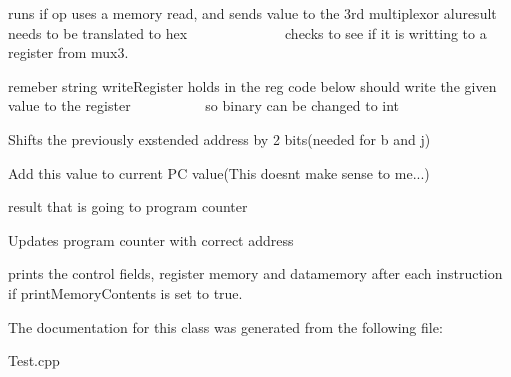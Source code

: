 runs if op uses a memory read, and sends value to the 3rd multiplexor aluresult needs to be translated to hex ~\newline
~\newline
~\newline
~\newline
~\newline
~\newline
~\newline
~\newline
 checks to see if it is writting to a register from mux3.

remeber string write\+Register holds in the reg code below should write the given value to the register ~\newline
~\newline
~\newline
~\newline
~\newline
~\newline
 so binary can be changed to int

Shifts the previously exstended address by 2 bits(needed for b and j)

Add this value to current PC value(This doesnt make sense to me...)

result that is going to program counter

Updates program counter with correct address

prints the control fields, register memory and datamemory after each instruction if print\+Memory\+Contents is set to true. 

The documentation for this class was generated from the following file\+:\begin{DoxyCompactItemize}
\item 
Test.\+cpp\end{DoxyCompactItemize}
